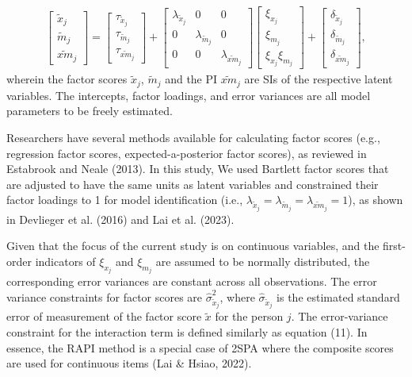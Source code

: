 \documentclass[
  man]{apa6}
\begin{document}
\begin{align}
    \begin{bmatrix}
        \tilde{x}_{j} \\ 
        \tilde{m}_{j} \\
        \widetilde{xm}_{j} 
    \end{bmatrix} = 
    \begin{bmatrix}
        \tau_{\tilde{x}_{j}} \\
        \tau_{\tilde{m}_{j}} \\ 
        \tau_{\widetilde{xm}_{j}}
    \end{bmatrix} + 
    \begin{bmatrix}
        \lambda_{\tilde{x}_{j}} & 0 & 0 \\
        0 & \lambda_{\tilde{m}_{j}} & 0 \\ 
        0 & 0 & \lambda_{\widetilde{xm}_{j}} 
    \end{bmatrix} 
    \begin{bmatrix}
        \xi_{x_{j}} \\  
        \xi_{m_{j}} \\
        \xi_{x_{j}}\xi_{m_{j}}
    \end{bmatrix} +
    \begin{bmatrix}
        \delta_{\tilde{x}_{j}} \\
        \delta_{\tilde{m}_{j}} \\ 
        \delta_{\widetilde{xm}_{j}}
    \end{bmatrix},
\end{align}
wherein the factor scores \(\tilde{x}_{j}\), \(\tilde{m}_{j}\) and the PI \(\widetilde{xm}_{j}\) are SIs of the respective latent variables. The intercepts, factor loadings, and error variances are all model parameters to be freely estimated.

Researchers have several methods available for calculating factor scores (e.g., regression factor scores, expected-a-posterior factor scores), as reviewed in Estabrook and Neale (2013). In this study, We used Bartlett factor scores that are adjusted to have the same units as latent variables and constrained their factor loadings to 1 for model identification (i.e., \(\lambda_{\tilde{x}_{j}} = \lambda_{\tilde{m}_{j}} = \lambda_{\widetilde{xm}_{j}} = 1\)), as shown in Devlieger et al. (2016) and Lai et al. (2023).

Given that the focus of the current study is on continuous variables, and the first-order indicators of \(\xi_{x_{j}}\) and \(\xi_{m_{j}}\) are assumed to be normally distributed, the corresponding error variances are constant across all observations. The error variance constraints for factor scores are \(\hat{\sigma}_{\tilde{x}_{j}}^2\), where \(\hat{\sigma}_{\tilde{x}_{j}}\) is the estimated standard error of measurement of the factor score \(\tilde{x}\) for the person \(j\). The error-variance constraint for the interaction term is defined similarly as equation (11). In essence, the RAPI method is a special case of 2SPA where the composite scores are used for continuous items (Lai \& Hsiao, 2022).
\end{document}

